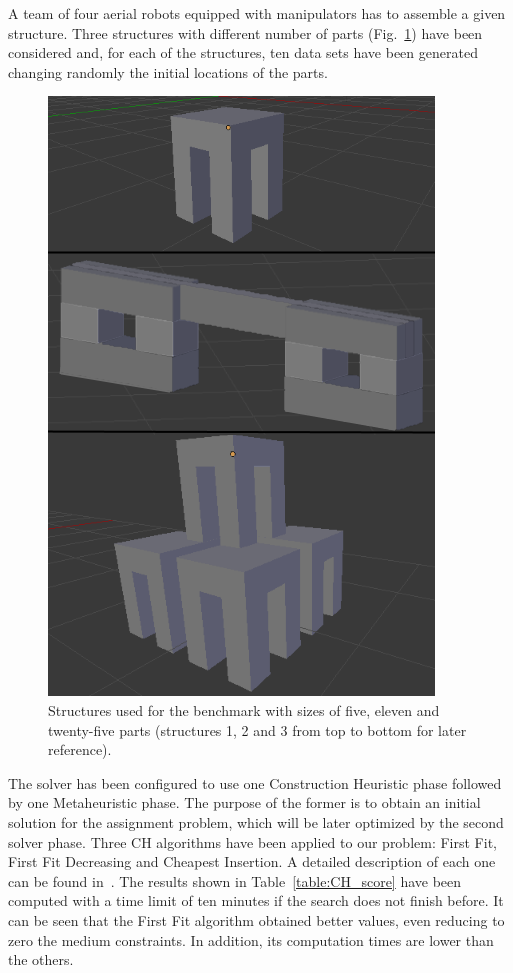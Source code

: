 \documentclass[letterpaper, 10 pt, conference]{ieeeconf}  %
\begin{document}
A team of four aerial robots equipped with manipulators has to assemble a given structure. Three structures with different number of parts (Fig.~\ref{fig:structures}) have been considered and, for each of the structures, ten data sets have been generated changing randomly the initial locations of the parts. 

\begin{figure}
    \centering
    \includegraphics[width=0.45\columnwidth]{structures.png}
    \caption[Structures.]{Structures used for the benchmark with sizes of five, eleven and twenty-five parts (structures 1, 2 and 3 from top to bottom for later reference).}
    \label{fig:structures}
\end{figure}

The solver has been configured to use one Construction Heuristic phase followed by one Metaheuristic phase. The purpose of the former is to obtain an initial solution for the assignment problem, which will be later optimized by the second solver phase. Three CH algorithms have been applied to our problem: First Fit, First Fit Decreasing and Cheapest Insertion. A detailed description of each one can be found in~\cite{optaplanner_guide}. The results shown in Table~\ref{table:CH_score} have been computed with a time limit of ten minutes if the search does not finish before. It can be seen that the First Fit algorithm obtained better values, even reducing to zero the medium constraints. In addition, its computation times are lower than the others.
\end{document}
